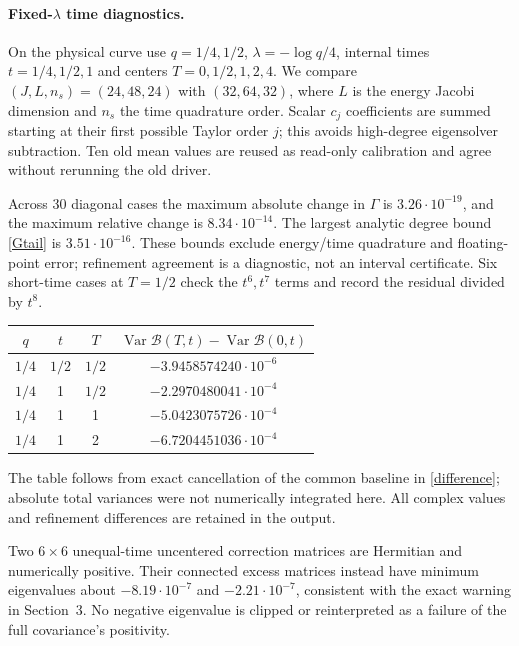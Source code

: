 \documentclass[11pt]{article}
\begin{document}
\paragraph{Fixed-$\lambda$ time diagnostics.}
On the physical curve use $q=1/4,1/2$, $\lambda=-\log q/4$,
internal times $t=1/4,1/2,1$ and centers $T=0,1/2,1,2,4$.
We compare $(J,L,n_s)=(24,48,24)$ with $(32,64,32)$, where
$L$ is the energy Jacobi dimension and $n_s$ the time quadrature
order. Scalar $c_j$ coefficients are summed starting at their
first possible Taylor order $j$; this avoids high-degree
eigensolver subtraction. Ten old mean values are reused as
read-only calibration and agree without rerunning the old driver.

Across 30 diagonal cases the maximum absolute change in
$\Gamma$ is $3.26\cdot10^{-19}$, and the maximum relative change
is $8.34\cdot10^{-14}$. The largest analytic degree bound
\eqref{Gtail} is $3.51\cdot10^{-16}$. These bounds exclude
energy/time quadrature and floating-point error; refinement
agreement is a diagnostic, not an interval certificate.
Six short-time cases at $T=1/2$ check the $t^6,t^7$ terms and
record the residual divided by $t^8$.

\begin{center}
\begin{tabular}{cccc}
\toprule
$q$&$t$&$T$&$\operatorname{Var}\mathcal B(T,t)-\operatorname{Var}\mathcal B(0,t)$\\
\midrule
$1/4$&$1/2$&$1/2$&$-3.9458574240\cdot10^{-6}$\\
$1/4$&1&$1/2$&$-2.2970480041\cdot10^{-4}$\\
$1/4$&1&1&$-5.0423075726\cdot10^{-4}$\\
$1/4$&1&2&$-6.7204451036\cdot10^{-4}$\\
\bottomrule
\end{tabular}
\end{center}
The table follows from exact cancellation of the common baseline
in \eqref{difference}; absolute total variances were not numerically
integrated here. All complex values and refinement differences
are retained in the output.

Two $6\times6$ unequal-time uncentered correction matrices are
Hermitian and numerically positive. Their connected excess
matrices instead have minimum eigenvalues about
$-8.19\cdot10^{-7}$ and $-2.21\cdot10^{-7}$, consistent with the
exact warning in Section~3. No negative eigenvalue is clipped or
reinterpreted as a failure of the full covariance's positivity.
\end{document}
